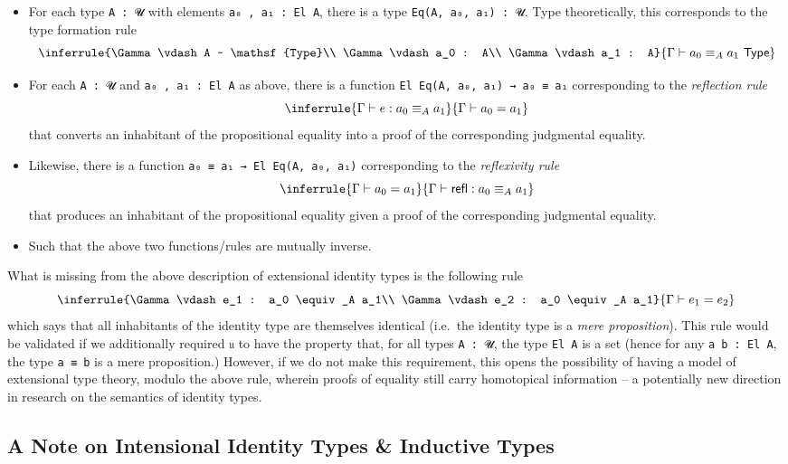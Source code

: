\documentclass[
  11pt,
  oneside,
  article]{memoir}
\providecommand{\tightlist}{%
  \setlength{\itemsep}{0pt}\setlength{\parskip}{0pt}}
\theoremstyle{definition}
\theoremstyle{plain}
\newcommand{\0}{\textsf{0}}
\newcommand{\1}{\tn{\textsf{1}}}
\begin{document}
\begin{itemize}
\tightlist
\item
  For each type \texttt{A\ :\ 𝓤} with elements
  \texttt{a₀\ ,\ a₁\ :\ El\ A}, there is a type
  \texttt{Eq(A,\ a₀,\ a₁)\ :\ 𝓤}. Type theoretically, this corresponds
  to the type formation rule \[
  \inferrule{\Gamma \vdash A ~ \mathsf{Type}\\ \Gamma \vdash a_0 : A\\ \Gamma \vdash a_1 : A}{\Gamma \vdash a_0 \equiv_A a_1 ~ \mathsf{Type}}
  \]
\item
  For each \texttt{A\ :\ 𝓤} and \texttt{a₀\ ,\ a₁\ :\ El\ A} as above,
  there is a function \texttt{El\ Eq(A,\ a₀,\ a₁)\ →\ a₀\ ≡\ a₁}
  corresponding to the \emph{reflection rule} \[
  \inferrule{\Gamma \vdash e : a_0 \equiv_A a_1}{\Gamma \vdash a_0 = a_1}
  \] that converts an inhabitant of the propositional equality into a
  proof of the corresponding judgmental equality.
\item
  Likewise, there is a function
  \texttt{a₀\ ≡\ a₁\ →\ El\ Eq(A,\ a₀,\ a₁)} corresponding to the
  \emph{reflexivity rule} \[
  \inferrule{\Gamma \vdash a_0 = a_1}{\Gamma \vdash \mathsf{refl} : a_0 \equiv_A a_1}
  \] that produces an inhabitant of the propositional equality given a
  proof of the corresponding judgmental equality.
\item
  Such that the above two functions/rules are mutually inverse.
\end{itemize}

What is missing from the above description of extensional identity types
is the following rule \[
\inferrule{\Gamma \vdash e_1 : a_0 \equiv_A a_1\\ \Gamma \vdash e_2 : a_0 \equiv_A a_1}{\Gamma \vdash e_1 = e_2}
\] which says that all inhabitants of the identity type are themselves
identical (i.e.~the identity type is a \emph{mere proposition}). This
rule would be validated if we additionally required \texttt{𝔲} to have
the property that, for all types \texttt{A\ :\ 𝓤}, the type
\texttt{El\ A} is a set (hence for any \texttt{a\ b\ :\ El\ A}, the type
\texttt{a\ ≡\ b} is a mere proposition.) However, if we do not make this
requirement, this opens the possibility of having a model of extensional
type theory, modulo the above rule, wherein proofs of equality still
carry homotopical information -- a potentially new direction in research
on the semantics of identity types.

\subsection{A Note on Intensional Identity Types \& Inductive
Types}\label{a-note-on-intensional-identity-types-inductive-types}
\end{document}

